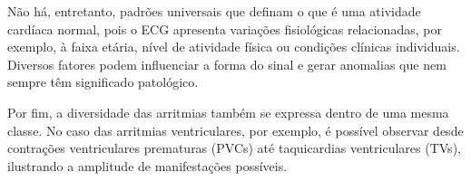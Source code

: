 Não há, entretanto, padrões universais que definam o que é uma atividade cardíaca normal, pois o ECG apresenta variações fisiológicas relacionadas, por exemplo, à faixa etária, nível de atividade física ou condições clínicas individuais. Diversos fatores podem influenciar a forma do sinal e gerar anomalias que nem sempre têm significado patológico.

Por fim, a diversidade das arritmias também se expressa dentro de uma mesma classe. No caso das arritmias ventriculares, por exemplo, é possível observar desde contrações ventriculares prematuras (PVCs) até taquicardias ventriculares (TVs), ilustrando a amplitude de manifestações possíveis.